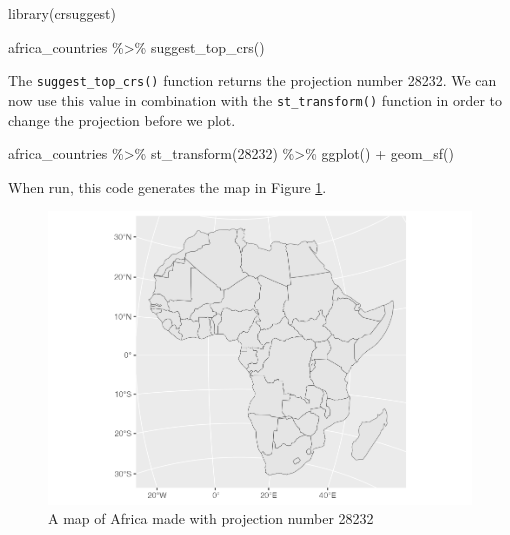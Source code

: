 \documentclass[
]{book}
\newenvironment{Shaded}{\begin{snugshade}}{\end{snugshade}}
\newcommand{\DecValTok}[1]{\textcolor[rgb]{0.00,0.00,0.81}{#1}}
\newcommand{\FunctionTok}[1]{\textcolor[rgb]{0.00,0.00,0.00}{#1}}
\newcommand{\NormalTok}[1]{#1}
\newcommand{\SpecialCharTok}[1]{\textcolor[rgb]{0.00,0.00,0.00}{#1}}
\begin{document}
\begin{Shaded}
\begin{Highlighting}[]
\FunctionTok{library}\NormalTok{(crsuggest)}

\NormalTok{africa\_countries }\SpecialCharTok{\%\textgreater{}\%} 
  \FunctionTok{suggest\_top\_crs}\NormalTok{()}
\end{Highlighting}
\end{Shaded}

The \texttt{suggest\_top\_crs()} function returns the projection number 28232. We can now use this value in combination with the \texttt{st\_transform()} function in order to change the projection before we plot.

\begin{Shaded}
\begin{Highlighting}[]
\NormalTok{africa\_countries }\SpecialCharTok{\%\textgreater{}\%}
  \FunctionTok{st\_transform}\NormalTok{(}\DecValTok{28232}\NormalTok{) }\SpecialCharTok{\%\textgreater{}\%} 
  \FunctionTok{ggplot}\NormalTok{() }\SpecialCharTok{+}
  \FunctionTok{geom\_sf}\NormalTok{()}
\end{Highlighting}
\end{Shaded}

When run, this code generates the map in Figure \ref{fig:africa-map-different-projection}.

\begin{figure}
\includegraphics[width=1\linewidth]{maps_files/figure-latex/africa-map-different-projection-1} \caption{A map of Africa made with projection number 28232}\label{fig:africa-map-different-projection}
\end{figure}
\end{document}
